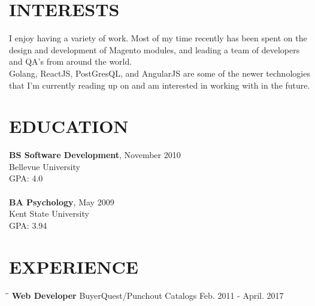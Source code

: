 \documentclass{res}
\begin{document}
\begin{resume}
\section{INTERESTS}          
    I enjoy having a variety of work. Most of my time recently has been spent on the design and
    development of Magento modules, and leading a team of developers and QA's from around the world. \\
    Golang, ReactJS, PostGresQL, and AngularJS are some of the newer technologies that I'm currently
    reading up on and am interested in working with in the future.
    
 
\section{EDUCATION}
    \textbf{BS Software Development}, November 2010 \\
    Bellevue University \\    
    GPA: 4.0 \\  
    \\
    \textbf{BA Psychology}, May 2009 \\
    Kent State University \\    
    GPA: 3.94
 
\section{EXPERIENCE}
   \vspace{-0.1in}	
   
   \begin{tabbing}
   		\hspace{2.0in}\= \hspace{2.7in}\= \kill %
    	\textbf{Web Developer} \>BuyerQuest/Punchout Catalogs     \>Feb. 2011 - April. 2017\\
   \end{tabbing}\vspace{-20pt}      %
   

\end{resume}
\end{document}
